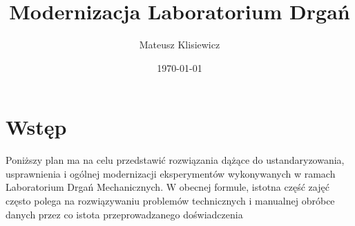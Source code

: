 \documentclass[12pt]{article}
\title{Modernizacja Laboratorium Drgań}
\author{Mateusz Klisiewicz}
\date{\today}
\title{\mytitle \\
  \large \mysubtitle}
\begin{document}
\maketitle
\newpage
\section*{Wstęp}
Poniższy plan ma na celu przedstawić rozwiązania dążące do ustandaryzowania, usprawnienia i ogólnej modernizacji eksperymentów wykonywanych w ramach Laboratorium Drgań Mechanicznych. W obecnej formule, istotna część zajęć często polega na rozwiązywaniu problemów technicznych i manualnej obróbce danych przez co istota przeprowadzanego doświadczenia 
\end{document}

